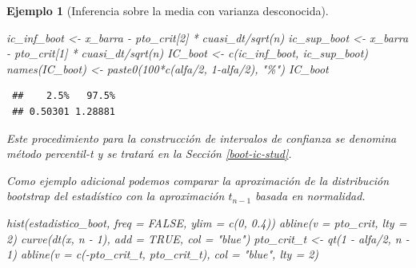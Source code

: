\documentclass[
  10pt,
]{book}
\newenvironment{Shaded}{\begin{snugshade}}{\end{snugshade}}
\newcommand{\AttributeTok}[1]{\textcolor[rgb]{0.77,0.63,0.00}{#1}}
\newcommand{\ConstantTok}[1]{\textcolor[rgb]{0.00,0.00,0.00}{#1}}
\newcommand{\DecValTok}[1]{\textcolor[rgb]{0.00,0.00,0.81}{#1}}
\newcommand{\FloatTok}[1]{\textcolor[rgb]{0.00,0.00,0.81}{#1}}
\newcommand{\FunctionTok}[1]{\textcolor[rgb]{0.00,0.00,0.00}{#1}}
\newcommand{\NormalTok}[1]{#1}
\newcommand{\OtherTok}[1]{\textcolor[rgb]{0.56,0.35,0.01}{#1}}
\newcommand{\SpecialCharTok}[1]{\textcolor[rgb]{0.00,0.00,0.00}{#1}}
\newcommand{\StringTok}[1]{\textcolor[rgb]{0.31,0.60,0.02}{#1}}
\theoremstyle{break}
\newtheorem{example}{Ejemplo}[chapter]
\theoremstyle{nonumberplain}
\begin{document}
\begin{example}[Inferencia sobre la media con varianza desconocida]
\begin{Shaded}
\begin{Highlighting}[]
\NormalTok{ic\_inf\_boot }\OtherTok{\textless{}{-}}\NormalTok{ x\_barra }\SpecialCharTok{{-}}\NormalTok{ pto\_crit[}\DecValTok{2}\NormalTok{] }\SpecialCharTok{*}\NormalTok{ cuasi\_dt}\SpecialCharTok{/}\FunctionTok{sqrt}\NormalTok{(n)}
\NormalTok{ic\_sup\_boot }\OtherTok{\textless{}{-}}\NormalTok{ x\_barra }\SpecialCharTok{{-}}\NormalTok{ pto\_crit[}\DecValTok{1}\NormalTok{] }\SpecialCharTok{*}\NormalTok{ cuasi\_dt}\SpecialCharTok{/}\FunctionTok{sqrt}\NormalTok{(n)}
\NormalTok{IC\_boot }\OtherTok{\textless{}{-}} \FunctionTok{c}\NormalTok{(ic\_inf\_boot, ic\_sup\_boot)}
\FunctionTok{names}\NormalTok{(IC\_boot) }\OtherTok{\textless{}{-}} \FunctionTok{paste0}\NormalTok{(}\DecValTok{100}\SpecialCharTok{*}\FunctionTok{c}\NormalTok{(alfa}\SpecialCharTok{/}\DecValTok{2}\NormalTok{, }\DecValTok{1}\SpecialCharTok{{-}}\NormalTok{alfa}\SpecialCharTok{/}\DecValTok{2}\NormalTok{), }\StringTok{"\%"}\NormalTok{)}
\NormalTok{IC\_boot}
\end{Highlighting}
\end{Shaded}

\begin{verbatim}
 ##    2.5%   97.5% 
 ## 0.50301 1.28881
\end{verbatim}

Este procedimiento para la construcción de intervalos de confianza se denomina \emph{método percentil-t} y se tratará en la Sección \ref{boot-ic-stud}.

Como ejemplo adicional podemos comparar la aproximación de la distribución bootstrap del estadístico con la aproximación \(t_{n-1}\) basada en normalidad.

\begin{Shaded}
\begin{Highlighting}[]
\FunctionTok{hist}\NormalTok{(estadistico\_boot, }\AttributeTok{freq =} \ConstantTok{FALSE}\NormalTok{, }\AttributeTok{ylim =} \FunctionTok{c}\NormalTok{(}\DecValTok{0}\NormalTok{, }\FloatTok{0.4}\NormalTok{))}
\FunctionTok{abline}\NormalTok{(}\AttributeTok{v =}\NormalTok{ pto\_crit, }\AttributeTok{lty =} \DecValTok{2}\NormalTok{)}
\FunctionTok{curve}\NormalTok{(}\FunctionTok{dt}\NormalTok{(x, n }\SpecialCharTok{{-}} \DecValTok{1}\NormalTok{), }\AttributeTok{add =} \ConstantTok{TRUE}\NormalTok{, }\AttributeTok{col =} \StringTok{"blue"}\NormalTok{)}
\NormalTok{pto\_crit\_t }\OtherTok{\textless{}{-}} \FunctionTok{qt}\NormalTok{(}\DecValTok{1} \SpecialCharTok{{-}}\NormalTok{ alfa}\SpecialCharTok{/}\DecValTok{2}\NormalTok{, n }\SpecialCharTok{{-}} \DecValTok{1}\NormalTok{)}
\FunctionTok{abline}\NormalTok{(}\AttributeTok{v =} \FunctionTok{c}\NormalTok{(}\SpecialCharTok{{-}}\NormalTok{pto\_crit\_t, pto\_crit\_t), }\AttributeTok{col =} \StringTok{"blue"}\NormalTok{, }\AttributeTok{lty =} \DecValTok{2}\NormalTok{)}
\end{Highlighting}
\end{Shaded}


\end{example}
\end{document}
